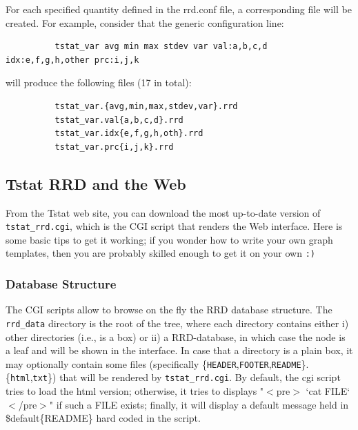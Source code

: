 \documentclass[11pt]{article}
\begin{document}
For each specified quantity defined in the rrd.conf file, a corresponding file
will be created.
For example, consider that the generic configuration line:

\begin{small}\begin{verbatim}
          tstat_var avg min max stdev var val:a,b,c,d idx:e,f,g,h,other prc:i,j,k
\end{verbatim}\end{small} \noindent
will produce the following files (17 in total):

\begin{small}\begin{verbatim}
          tstat_var.{avg,min,max,stdev,var}.rrd
          tstat_var.val{a,b,c,d}.rrd
          tstat_var.idx{e,f,g,h,oth}.rrd
          tstat_var.prc{i,j,k}.rrd
\end{verbatim}\end{small} \noindent
\subsection{Tstat RRD and the Web\label{Tstat_RRD_and_the_Web}}


From the Tstat web site, you can
download the most up-to-date version of \texttt{tstat\_rrd.cgi},
which is the CGI script that renders the Web interface.
Here is some basic tips to get it working; if you wonder
how to write your own graph templates, then you are probably
skilled enough to get it on your own \texttt{:)}

\subsubsection{Database Structure\label{Database_Structure}}


The CGI scripts allow to browse on the fly the RRD database structure.
The \texttt{rrd\_data} directory is the root of the tree, where each
directory contains either i) other directories (i.e., is a box) 
or ii) a RRD-database, in which case the node is a leaf and will be
shown in the interface. In case that a directory is a plain box, it may
optionally contain some files (specifically 
\{\texttt{HEADER},\texttt{FOOTER},\texttt{README}\}.\{\texttt{html},\texttt{txt}\})
that will be rendered by \texttt{tstat\_rrd.cgi}. 
By default, the cgi script tries to load the html version;
otherwise, it tries to displays "$<$pre$>$ `cat FILE` $<$/pre$>$"
if such a FILE exists; finally, it will display a default message
held in \$default\{README\} hard coded in the script.
\end{document}
